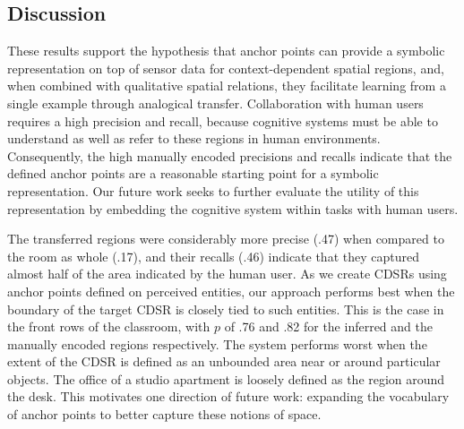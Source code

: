 \subsection{Discussion}

These results support the hypothesis that anchor points can provide a symbolic representation on top of sensor data for context-dependent spatial regions, and, when combined with qualitative spatial relations, they facilitate learning from a single example through analogical transfer. Collaboration with human users requires a high precision and recall, because cognitive systems must be able to understand as well as refer to these regions in human environments. Consequently, the high manually encoded precisions and recalls indicate that the defined anchor points are a reasonable starting point for a symbolic representation. Our future work seeks to further evaluate the utility of this representation by embedding the cognitive system within tasks with human users.

The transferred regions were considerably more precise (.47) when compared to the room as whole (.17), and their recalls (.46) indicate that they captured almost half of the area indicated by the human user. As we create CDSRs using anchor points defined on perceived entities, our approach performs best when the boundary of the target CDSR is closely tied to such entities. This is the case in the front rows of the classroom, with $p$ of .76 and .82 for the inferred and the manually encoded regions respectively. The system performs worst when the extent of the CDSR is defined as an unbounded area near or around particular objects. The office of a studio apartment is loosely defined as the region around the desk. This motivates one direction of future work:  expanding the vocabulary of anchor points to better capture these notions of space.
